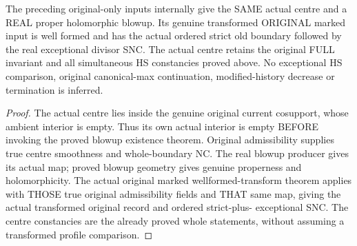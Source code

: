 \begin{theorem}
\label{hir:original-current-compact-simultaneous-hs-first-blowup}
\leanok
The preceding original-only inputs internally give the SAME actual centre
and a REAL proper holomorphic blowup. Its genuine transformed ORIGINAL
marked input is well formed and has the actual ordered strict old boundary
followed by the real exceptional divisor SNC. The actual centre retains
the original FULL invariant and all simultaneous HS constancies proved
above. No exceptional HS comparison, original canonical-max continuation,
modified-history decrease or termination is inferred.
\end{theorem}
\begin{proof}
The actual centre lies inside the genuine original current cosupport, whose
ambient interior is empty. Thus its own actual interior is empty BEFORE
invoking the proved blowup existence theorem. Original admissibility supplies
true centre smoothness and whole-boundary NC. The real blowup producer gives
its actual map; proved blowup geometry gives genuine properness and
holomorphicity. The actual original marked wellformed-transform theorem
applies with THOSE true original admissibility fields and THAT same map,
giving the actual transformed original record and ordered strict-plus-
exceptional SNC. The centre constancies are the already proved whole
statements, without assuming a transformed profile comparison.
\end{proof}

